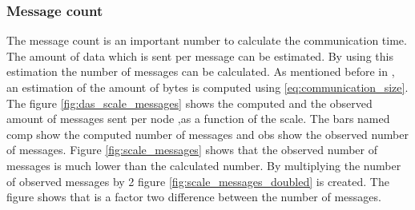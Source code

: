 \subsubsection{Message count}
The message count is an important number to calculate the communication time. The amount of data which is sent per message can be estimated. By using this estimation the number of messages can be calculated. As mentioned before in \cite{suzumura2011performance}, an estimation of the amount of bytes is computed using \ref{eq:communication_size}. The figure \ref{fig:das_scale_messages} shows the computed and the observed amount of messages sent per node ,as a function of the scale. The bars named comp show the computed number of messages and obs show the observed number of messages. Figure \ref{fig:scale_messages} shows that the observed number of messages is much lower than the calculated number. By multiplying the number of observed messages by 2 figure \ref{fig:scale_messages_doubled} is created. The figure shows that is a factor two difference between the number of messages. 
